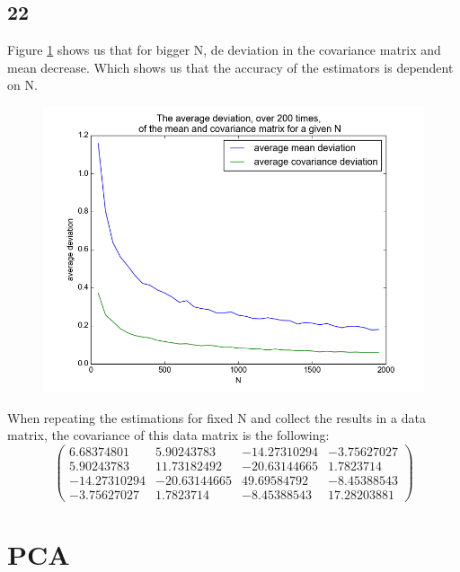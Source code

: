 \documentclass[a4paper,12px]{article}
\begin{document}
\subsection{22}
Figure \ref{fig:22} shows us that for bigger N, de deviation in the covariance matrix
 and mean decrease. Which shows us that the accuracy of the estimators is dependent on N.
\begin{figure}
    \centering
    \includegraphics[width=1\textwidth]{fig22.png}
    \caption{}
    \label{fig:22}
\end{figure}
\FloatBarrier
When repeating the estimations for fixed N and collect the results in a data
 matrix, the covariance of this data matrix is the following:
\begin{equation}
\left(\begin{matrix}
  6.68374801 &   5.90243783 & -14.27310294 & -3.75627027\\
  5.90243783 &  11.73182492 & -20.63144665 &  1.7823714 \\
-14.27310294 & -20.63144665 &  49.69584792 & -8.45388543\\
 -3.75627027 &   1.7823714  &  -8.45388543 & 17.28203881\end{matrix}\right)
\end{equation}


\section{PCA}
\end{document}
